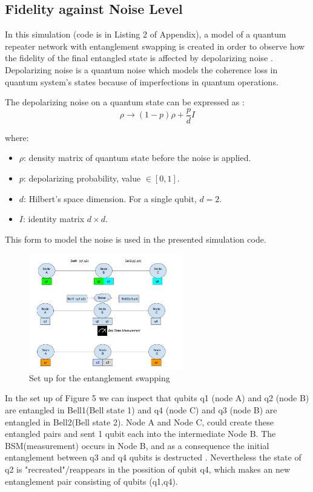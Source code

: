 \documentclass[12pt]{ieeetj}
\begin{document}
		\subsection{Fidelity against Noise Level}	
		
		In this simulation (code is in Listing 2 of Appendix), a model of a quantum repeater network with
		entanglement swapping is created in order to observe how the fidelity of the final entangled state is
		affected by depolarizing noise \cite{depolarization}. Depolarizing noise is a quantum noise which models the
		coherence loss in quantum system's states because of imperfections in quantum operations.
		
		The depolarizing noise on a quantum state can be expressed as \cite{depolar2}:
			\[
			\rho \to (1-p)\rho + \frac{p}{d}I
			\]

		where:

		\begin{itemize}
			    \item \( \rho \): density matrix of quantum state before the noise is applied.
			    \item \( p \): depolarizing probability,  value \(\in [0, 1]\).
			    \item \( d \): Hilbert's space dimension. For a single qubit, \( d = 2 \).
			    \item \( I \): identity matrix \( d \times d \).
		\end{itemize}

		This form to model the noise is used in the presented simulation code.
	
		\begin{figure}[H]
			\centering
			\includegraphics[width=0.6\textwidth]{repeater/entanglement_swap.png}
			\caption{Set up for the entanglement swapping}
			\label{fig5:}
		\end{figure}		

		In the set up of Figure 5 we can inspect that qubits q1 (node A) and q2 (node B) are
		entangled in Bell1(Bell state 1) and q4 (node C) and q3 (node B) are entangled in Bell2(Bell state 2).
		Node A and Node C, could create these entangled pairs and sent 1 qubit each into the intermediate
		Node B. The BSM(measurement) occurs in Node B, and as a consequence the initial entanglement between
		q3 and q4 qubits is destructed \cite{rfc}. Nevertheless the state of q2 is "recreated"/reappears in the possition
		of qubit q4, which makes an new entanglement pair consisting of qubits (q1,q4).
\end{document}
